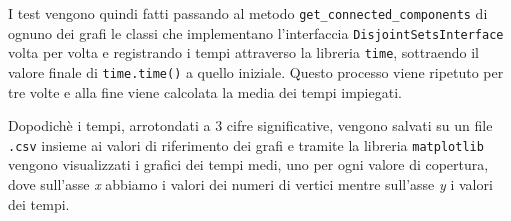 I test vengono quindi fatti passando al metodo \texttt{get\_connected\_components} di ognuno dei grafi le classi che implementano
l'interfaccia \texttt{DisjointSetsInterface} volta per volta e registrando i tempi attraverso la libreria \texttt{time}, sottraendo
il valore finale di \texttt{time.time()} a quello iniziale. Questo processo viene ripetuto per tre volte e alla fine viene calcolata
la media dei tempi impiegati.\newline

Dopodichè i tempi, arrotondati a 3 cifre significative, vengono salvati su un file \texttt{.csv} insieme ai valori di riferimento dei grafi e tramite la libreria \texttt{matplotlib}
vengono visualizzati i grafici dei tempi medi, uno per ogni valore di copertura, dove sull'asse \textit{x} abbiamo i valori dei numeri di vertici mentre
sull'asse \textit{y} i valori dei tempi.


